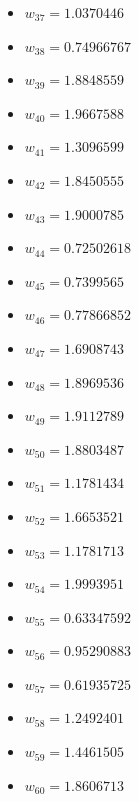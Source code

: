 \documentclass[11pt]{article}
\begin{document}
\begin{itemize}
\item $w_{37} = 1.0370446$
\item $w_{38} = 0.74966767$
\item $w_{39} = 1.8848559$
\item $w_{40} = 1.9667588$
\item $w_{41} = 1.3096599$
\item $w_{42} = 1.8450555$
\item $w_{43} = 1.9000785$
\item $w_{44} = 0.72502618$
\item $w_{45} = 0.7399565$
\item $w_{46} = 0.77866852$
\item $w_{47} = 1.6908743$
\item $w_{48} = 1.8969536$
\item $w_{49} = 1.9112789$
\item $w_{50} = 1.8803487$
\item $w_{51} = 1.1781434$
\item $w_{52} = 1.6653521$
\item $w_{53} = 1.1781713$
\item $w_{54} = 1.9993951$
\item $w_{55} = 0.63347592$
\item $w_{56} = 0.95290883$
\item $w_{57} = 0.61935725$
\item $w_{58} = 1.2492401$
\item $w_{59} = 1.4461505$
\item $w_{60} = 1.8606713$
\end{itemize}
\end{document}

